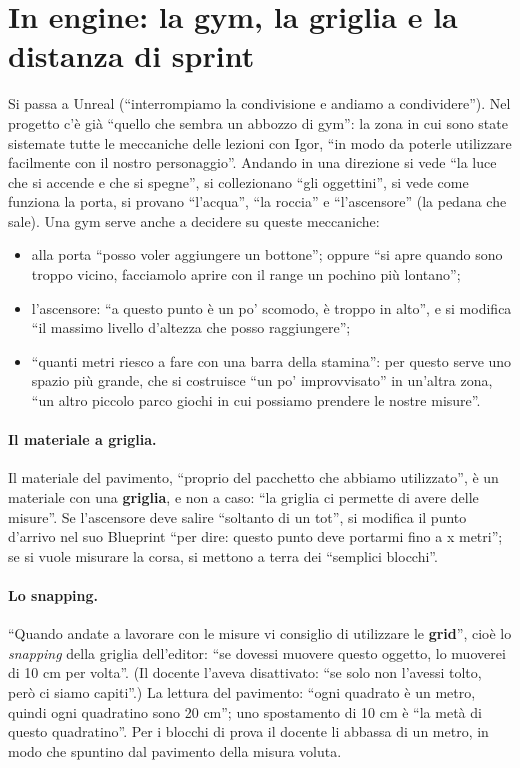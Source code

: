 \section{In engine: la gym, la griglia e la distanza di sprint}
\label{ue13:sec:sprint}

Si passa a Unreal (``interrompiamo la condivisione e andiamo a condividere''). Nel progetto
c'è già ``quello che sembra un abbozzo di gym'': la zona in cui sono state sistemate tutte
le meccaniche delle lezioni con Igor, ``in modo da poterle utilizzare facilmente con il
nostro personaggio''. Andando in una direzione si vede ``la luce che si accende e che si
spegne'', si collezionano ``gli oggettini'', si vede come funziona la porta, si provano
``l'acqua'', ``la roccia'' e ``l'ascensore'' (la pedana che sale). Una gym serve anche a
decidere su queste meccaniche:
\begin{itemize}
  \item alla porta ``posso voler aggiungere un bottone''; oppure ``si apre quando sono
        troppo vicino, facciamolo aprire con il range un pochino più lontano'';
  \item l'ascensore: ``a questo punto è un po' scomodo, è troppo in alto'', e si modifica
        ``il massimo livello d'altezza che posso raggiungere'';
  \item ``quanti metri riesco a fare con una barra della stamina'': per questo serve uno
        spazio più grande, che si costruisce ``un po' improvvisato'' in un'altra zona, ``un
        altro piccolo parco giochi in cui possiamo prendere le nostre misure''.
\end{itemize}

\paragraph{Il materiale a griglia.} Il materiale del pavimento, ``proprio del pacchetto
che abbiamo utilizzato'', è un materiale con una \textbf{griglia}, e non a caso: ``la
griglia ci permette di avere delle misure''. Se l'ascensore deve salire ``soltanto di un
tot'', si modifica il punto d'arrivo nel suo Blueprint ``per dire: questo punto deve
portarmi fino a x metri''; se si vuole misurare la corsa, si mettono a terra dei
``semplici blocchi''.

\paragraph{Lo snapping.} ``Quando andate a lavorare con le misure vi consiglio di
utilizzare le \textbf{grid}'', cioè lo \emph{snapping} della griglia dell'editor: ``se
dovessi muovere questo oggetto, lo muoverei di 10 cm per volta''. (Il docente l'aveva
disattivato: ``se solo non l'avessi tolto, però ci siamo capiti''.) La lettura del
pavimento: ``ogni quadrato è un metro, quindi ogni quadratino sono 20 cm''; uno spostamento
di 10 cm è ``la metà di questo quadratino''. Per i blocchi di prova il docente li abbassa
di un metro, in modo che spuntino dal pavimento della misura voluta.

